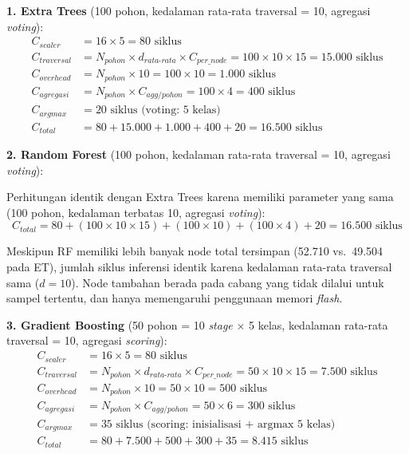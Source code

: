 \textbf{1. Extra Trees} (100 pohon, kedalaman rata-rata traversal = 10, agregasi \textit{voting}):
\begin{align}
    C_{scaler} &= 16 \times 5 = 80 \text{ siklus} \nonumber \\
    C_{traversal} &= N_{pohon} \times d_{rata\text{-}rata} \times C_{per\_node} = 100 \times 10 \times 15 = 15.000 \text{ siklus} \nonumber \\
    C_{overhead} &= N_{pohon} \times 10 = 100 \times 10 = 1.000 \text{ siklus} \nonumber \\
    C_{agregasi} &= N_{pohon} \times C_{agg/pohon} = 100 \times 4 = 400 \text{ siklus} \nonumber \\
    C_{argmax} &= 20 \text{ siklus (voting: 5 kelas)} \nonumber \\
    C_{total} &= 80 + 15.000 + 1.000 + 400 + 20 = \mathbf{16.500} \text{ siklus} \nonumber
\end{align}

\textbf{2. Random Forest} (100 pohon, kedalaman rata-rata traversal = 10, agregasi \textit{voting}):

Perhitungan identik dengan Extra Trees karena memiliki parameter yang sama (100 pohon, kedalaman terbatas 10, agregasi \textit{voting}):
\begin{equation}
    C_{total} = 80 + (100 \times 10 \times 15) + (100 \times 10) + (100 \times 4) + 20 = \mathbf{16.500} \text{ siklus} \nonumber
\end{equation}

Meskipun RF memiliki lebih banyak node total tersimpan (52.710 vs.\ 49.504 pada ET), jumlah siklus inferensi identik karena kedalaman rata-rata traversal sama ($d = 10$). Node tambahan berada pada cabang yang tidak dilalui untuk sampel tertentu, dan hanya memengaruhi penggunaan memori \textit{flash}.

\textbf{3. Gradient Boosting} (50 pohon = 10 \textit{stage} $\times$ 5 kelas, kedalaman rata-rata traversal = 10, agregasi \textit{scoring}):
\begin{align}
    C_{scaler} &= 16 \times 5 = 80 \text{ siklus} \nonumber \\
    C_{traversal} &= N_{pohon} \times d_{rata\text{-}rata} \times C_{per\_node} = 50 \times 10 \times 15 = 7.500 \text{ siklus} \nonumber \\
    C_{overhead} &= N_{pohon} \times 10 = 50 \times 10 = 500 \text{ siklus} \nonumber \\
    C_{agregasi} &= N_{pohon} \times C_{agg/pohon} = 50 \times 6 = 300 \text{ siklus} \nonumber \\
    C_{argmax} &= 35 \text{ siklus (scoring: inisialisasi + argmax 5 kelas)} \nonumber \\
    C_{total} &= 80 + 7.500 + 500 + 300 + 35 = \mathbf{8.415} \text{ siklus} \nonumber
\end{align}

